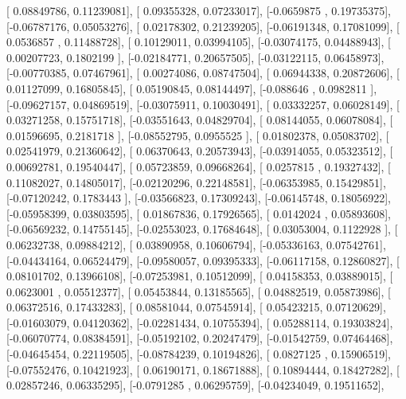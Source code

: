 \documentclass{article}
\begin{document}
       [ 0.08849786,  0.11239081],
       [ 0.09355328,  0.07233017],
       [-0.0659875 ,  0.19735375],
       [-0.06787176,  0.05053276],
       [ 0.02178302,  0.21239205],
       [-0.06191348,  0.17081099],
       [ 0.0536857 ,  0.11488728],
       [ 0.10129011,  0.03994105],
       [-0.03074175,  0.04488943],
       [ 0.00207723,  0.1802199 ],
       [-0.02184771,  0.20657505],
       [-0.03122115,  0.06458973],
       [-0.00770385,  0.07467961],
       [ 0.00274086,  0.08747504],
       [ 0.06944338,  0.20872606],
       [ 0.01127099,  0.16805845],
       [ 0.05190845,  0.08144497],
       [-0.088646  ,  0.0982811 ],
       [-0.09627157,  0.04869519],
       [-0.03075911,  0.10030491],
       [ 0.03332257,  0.06028149],
       [ 0.03271258,  0.15751718],
       [-0.03551643,  0.04829704],
       [ 0.08144055,  0.06078084],
       [ 0.01596695,  0.2181718 ],
       [-0.08552795,  0.0955525 ],
       [ 0.01802378,  0.05083702],
       [ 0.02541979,  0.21360642],
       [ 0.06370643,  0.20573943],
       [-0.03914055,  0.05323512],
       [ 0.00692781,  0.19540447],
       [ 0.05723859,  0.09668264],
       [ 0.0257815 ,  0.19327432],
       [ 0.11082027,  0.14805017],
       [-0.02120296,  0.22148581],
       [-0.06353985,  0.15429851],
       [-0.07120242,  0.1783443 ],
       [-0.03566823,  0.17309243],
       [-0.06145748,  0.18056922],
       [-0.05958399,  0.03803595],
       [ 0.01867836,  0.17926565],
       [ 0.0142024 ,  0.05893608],
       [-0.06569232,  0.14755145],
       [-0.02553023,  0.17684648],
       [ 0.03053004,  0.1122928 ],
       [ 0.06232738,  0.09884212],
       [ 0.03890958,  0.10606794],
       [-0.05336163,  0.07542761],
       [-0.04434164,  0.06524479],
       [-0.09580057,  0.09395333],
       [-0.06117158,  0.12860827],
       [ 0.08101702,  0.13966108],
       [-0.07253981,  0.10512099],
       [ 0.04158353,  0.03889015],
       [ 0.0623001 ,  0.05512377],
       [ 0.05453844,  0.13185565],
       [ 0.04882519,  0.05873986],
       [ 0.06372516,  0.17433283],
       [ 0.08581044,  0.07545914],
       [ 0.05423215,  0.07120629],
       [-0.01603079,  0.04120362],
       [-0.02281434,  0.10755394],
       [ 0.05288114,  0.19303824],
       [-0.06070774,  0.08384591],
       [-0.05192102,  0.20247479],
       [-0.01542759,  0.07464468],
       [-0.04645454,  0.22119505],
       [-0.08784239,  0.10194826],
       [ 0.0827125 ,  0.15906519],
       [-0.07552476,  0.10421923],
       [ 0.06190171,  0.18671888],
       [ 0.10894444,  0.18427282],
       [ 0.02857246,  0.06335295],
       [-0.0791285 ,  0.06295759],
       [-0.04234049,  0.19511652],
\end{document}
